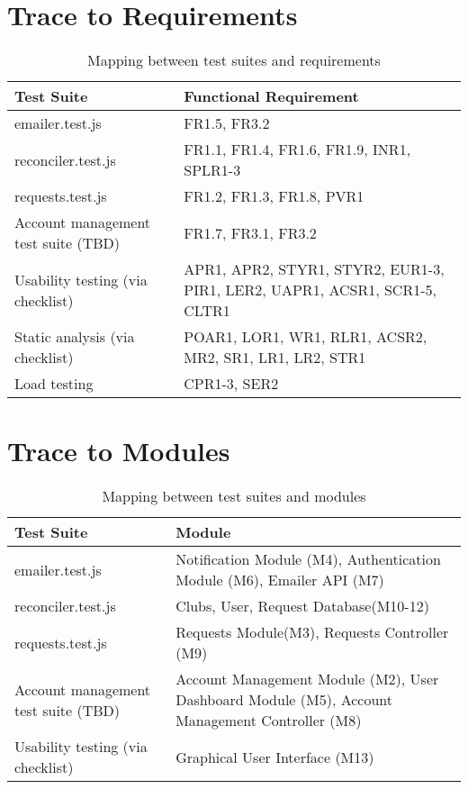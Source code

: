 \documentclass[12pt, titlepage]{article}
\begin{document}
\section{Trace to Requirements}

\begin{table}[!h]
\begin{tabularx}{\textwidth}{p{5cm}p{5cm}}
\toprule {\bf Test Suite} & {\bf Functional Requirement}\\
\midrule 
emailer.test.js & FR1.5, FR3.2\\
reconciler.test.js & FR1.1, FR1.4, FR1.6, FR1.9, INR1, SPLR1-3\\
requests.test.js & FR1.2, FR1.3, FR1.8, PVR1\\ 
Account management test suite (TBD) & FR1.7, FR3.1, FR3.2\\
Usability testing (via checklist) & APR1, APR2, STYR1, STYR2, EUR1-3, PIR1, LER2, UAPR1, ACSR1, SCR1-5, CLTR1\\
Static analysis (via checklist) & POAR1, LOR1, WR1, RLR1, ACSR2, MR2, SR1, LR1, LR2, STR1\\
Load testing & CPR1-3, SER2\\
\bottomrule
\end{tabularx}
\caption{Mapping between test suites and requirements}
\end{table}

\section{Trace to Modules}
\newpage
\begin{table}[!h]
\begin{tabularx}{\textwidth}{p{5cm}p{5cm}}
\toprule {\bf Test Suite} & {\bf Module}\\
\midrule 
emailer.test.js & Notification Module (M4), Authentication Module (M6), Emailer API (M7)\\
reconciler.test.js & Clubs, User, Request Database(M10-12)\\
requests.test.js & Requests Module(M3), Requests Controller (M9)\\
Account management test suite (TBD) & Account Management Module (M2), User Dashboard Module (M5), Account Management Controller (M8)\\
Usability testing (via checklist) & Graphical User Interface (M13)\\
\bottomrule
\end{tabularx}
\caption{Mapping between test suites and modules}
\end{table}
\end{document}
